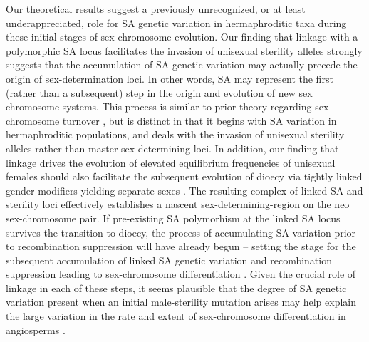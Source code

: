 \documentclass[9pt,twocolumn,twoside,lineno]{gsajnl}
\begin{document}
Our theoretical results suggest a previously unrecognized, or at least underappreciated, role for SA genetic variation in hermaphroditic taxa during these initial stages of sex-chromosome evolution. Our finding that linkage with a polymorphic SA locus facilitates the invasion of unisexual sterility alleles strongly suggests that the accumulation of SA genetic variation may actually precede the origin of sex-determination loci. In other words, SA may represent the first (rather than a subsequent) step in the origin and evolution of new sex chromosome systems. This process is similar to prior theory regarding sex chromosome turnover \citep{vanDoornKirkpatrick2007,vanDoornKirkpatrick2010}, but is distinct in that it begins with SA variation in hermaphroditic populations, and deals with the invasion of unisexual sterility alleles rather than master sex-determining loci. In addition, our finding that linkage drives the evolution of elevated equilibrium frequencies of unisexual females should also facilitate the subsequent evolution of dioecy via tightly linked gender modifiers yielding separate sexes \citep{Charlesworth1978a}. The resulting complex of linked SA and sterility loci effectively establishes a nascent sex-determining-region on the neo sex-chromosome pair. If pre-existing SA polymorhism at the linked SA locus survives the transition to dioecy, the process of accumulating SA variation prior to recombination suppression will have already begun -- setting the stage for the subsequent accumulation of linked SA genetic variation and recombination suppression leading to sex-chromosome differentiation \citep{Charlesworth1978a,Rice1987,Bachtrog2006,Qiuetal2013}. Given the crucial role of linkage in each of these steps, it seems plausible that the degree of SA genetic variation present when an initial male-sterility mutation arises may help explain the large variation in the rate and extent of sex-chromosome differentiation in angiosperms \citep{Charlesworth2002,Renner2014,Bachtrog2014}.



\end{document}
